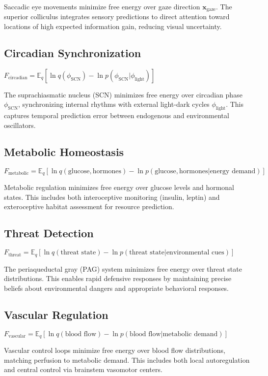 \documentclass[10pt]{article}
\begin{document}
Saccadic eye movements minimize free energy over gaze direction $\mathbf{x}_{\text{gaze}}$. The superior colliculus integrates sensory predictions to direct attention toward locations of high expected information gain, reducing visual uncertainty.

\subsection{Circadian Synchronization}
$F_{\text{circadian}} = \mathbb{E}_q[\ln q(\phi_{\text{SCN}}) - \ln p(\phi_{\text{SCN}}|\phi_{\text{light}})]$

The suprachiasmatic nucleus (SCN) minimizes free energy over circadian phase $\phi_{\text{SCN}}$, synchronizing internal rhythms with external light-dark cycles $\phi_{\text{light}}$. This captures temporal prediction error between endogenous and environmental oscillators.

\subsection{Metabolic Homeostasis}
$F_{\text{metabolic}} = \mathbb{E}_q[\ln q(\text{glucose}, \text{hormones}) - \ln p(\text{glucose}, \text{hormones}|\text{energy demand})]$

Metabolic regulation minimizes free energy over glucose levels and hormonal states. This includes both interoceptive monitoring (insulin, leptin) and exteroceptive habitat assessment for resource prediction.

\subsection{Threat Detection}
$F_{\text{threat}} = \mathbb{E}_q[\ln q(\text{threat state}) - \ln p(\text{threat state}|\text{environmental cues})]$

The periaqueductal gray (PAG) system minimizes free energy over threat state distributions. This enables rapid defensive responses by maintaining precise beliefs about environmental dangers and appropriate behavioral responses.

\subsection{Vascular Regulation}
$F_{\text{vascular}} = \mathbb{E}_q[\ln q(\text{blood flow}) - \ln p(\text{blood flow}|\text{metabolic demand})]$

Vascular control loops minimize free energy over blood flow distributions, matching perfusion to metabolic demand. This includes both local autoregulation and central control via brainstem vasomotor centers.
\end{document}
